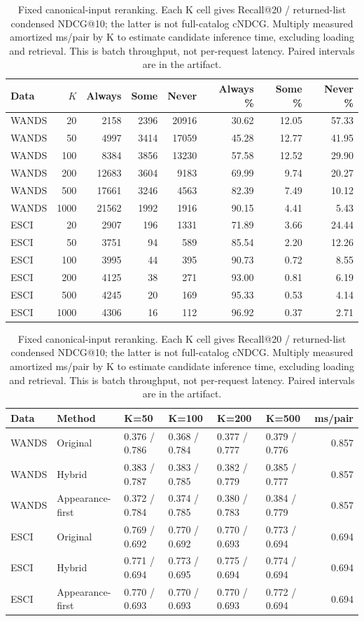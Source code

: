 \begin{table}[tp]
\caption{BGE seven-order coverage. Counts are highest-label query--product pairs; macro percentages average within eligible queries. All historical queries are used here, unlike strategy selection/held-out tables. Sometimes means crossing; never is persistent omission.}\label{tab:allcoverage}
\centering\small
\begin{tabular}{lrrrrrrr}\toprule
Data & $K$ & Always & Some & Never & Always \% & Some \% & Never \%\\\midrule
WANDS & 20 & 2158 & 2396 & 20916 & 30.62 & 12.05 & 57.33\\
WANDS & 50 & 4997 & 3414 & 17059 & 45.28 & 12.77 & 41.95\\
WANDS & 100 & 8384 & 3856 & 13230 & 57.58 & 12.52 & 29.90\\
WANDS & 200 & 12683 & 3604 & 9183 & 69.99 & 9.74 & 20.27\\
WANDS & 500 & 17661 & 3246 & 4563 & 82.39 & 7.49 & 10.12\\
WANDS & 1000 & 21562 & 1992 & 1916 & 90.15 & 4.41 & 5.43\\
ESCI & 20 & 2907 & 196 & 1331 & 71.89 & 3.66 & 24.44\\
ESCI & 50 & 3751 & 94 & 589 & 85.54 & 2.20 & 12.26\\
ESCI & 100 & 3995 & 44 & 395 & 90.73 & 0.72 & 8.55\\
ESCI & 200 & 4125 & 38 & 271 & 93.00 & 0.81 & 6.19\\
ESCI & 500 & 4245 & 20 & 169 & 95.33 & 0.53 & 4.14\\
ESCI & 1000 & 4306 & 16 & 112 & 96.92 & 0.37 & 2.71\\
\bottomrule\end{tabular}
\par\medskip
\caption{Fixed canonical-input reranking. Each K cell gives Recall@20 / returned-list condensed NDCG@10; the latter is not full-catalog cNDCG. Multiply measured amortized ms/pair by K to estimate candidate inference time, excluding loading and retrieval. This is batch throughput, not per-request latency. Paired intervals are in the artifact.}\label{tab:rerankdetail}
\centering\small
\begin{tabular}{llllllr}\toprule
Data & Method & K=50 & K=100 & K=200 & K=500 & ms/pair\\\midrule
WANDS & Original & 0.376 / 0.786 & 0.368 / 0.784 & 0.377 / 0.777 & 0.379 / 0.776 & 0.857\\
WANDS & Hybrid & 0.383 / 0.787 & 0.383 / 0.785 & 0.382 / 0.779 & 0.385 / 0.777 & 0.857\\
WANDS & Appearance-first & 0.372 / 0.784 & 0.374 / 0.785 & 0.380 / 0.783 & 0.384 / 0.779 & 0.857\\
ESCI & Original & 0.769 / 0.692 & 0.770 / 0.692 & 0.770 / 0.693 & 0.773 / 0.694 & 0.694\\
ESCI & Hybrid & 0.771 / 0.694 & 0.773 / 0.695 & 0.775 / 0.694 & 0.774 / 0.694 & 0.694\\
ESCI & Appearance-first & 0.770 / 0.693 & 0.770 / 0.693 & 0.770 / 0.693 & 0.772 / 0.694 & 0.694\\
\bottomrule\end{tabular}
\end{table}
